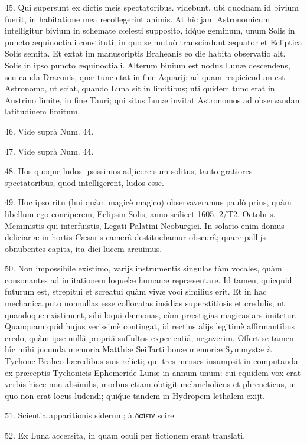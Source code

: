 \documentclass[a4paper, 11pt, oneside, polutonikogreek, german]{article}
\begin{document}
45. Qui supersunt ex dictis meis spectatoribus. videbunt, ubi quodnam id bivium fuerit, in habitatione mea recollegerint animis. At hîc jam Astronomicum intelligitur bivium in schemate cœlesti supposito, id\'que geminum, unum Solis in puncto æquinoctiali constituti; in quo se mutuò transcindunt æquator et Ecliptica Solis semita. Et extat im manuscriptis Braheanis eo die habita observatio alt. Solis in ipso puncto æquinoctiali. Alterum biuium est nodus Lunæ descendens, seu cauda Draconis, quæ tunc etat in fine Aquarij: ad quam respiciendum est Astronomo, ut sciat, quando Luna sit in limitibus; uti quidem tunc erat in Austrino limite, in fine Tauri; qui situs Lunæ invitat Astronomos ad observandam latitudinem limitum.

46. Vide suprà Num. 44.

47. Vide suprà Num. 44.

48. Hos quoque ludos ipsissimos adjicere sum solitus, tanto gratiores spectatoribus, quod intelligerent, ludos esse.

49. Hoc ipso ritu (hui quàm magicè magico) observaveramus paulò prius, quàm libellum ego conciperem, Eclipsin Solis, anno scilicet 1605. 2/T2. Octobris. Meministis qui interfuistis, Legati Palatini Neoburgici. In solario enim domus deliciariæ in hortis Cæsaris camerâ destituebamur obscurâ; quare pallijs obnubentes capita, ita diei lucem arcuimus.

50. Non impossibile existimo, varijs instrumentis singulas tàm vocales, quàm consonantes ad imitationem loquelæ humanæ repræsentare. Id tamen, quicquid futurum est, strepitui et screatui quàm vivæ voci similius erit. Et in hac mechanica puto nonnullas esse collocatas insidias superstitiosis et credulis, ut quandoque existiment, sibi loqui dæmonas, cùm præstigias magicas ars imitetur. Quanquam quid hujus verissimè contingat, id rectius alijs legitimè affirmantibus credo, quàm ipse nullâ propriâ suffultus experientiâ, negaverim.\hspace*{5mm}
Offert se tamen hîc mihi jucunda memoria Matthiæ Seiffarti bonæ memoriæ Symmystæ à Tychone Braheo hæredibus suis relicti; qui tres menses insumpsit in computanda ex præceptis Tychonicis Ephemeride Lunæ in annum unum: cui equidem vox erat verbis hisce non absimilis, morbus etiam obtigit melancholicus et phreneticus, in quo non erat locus ludendi; qui\'que tandem in Hydropem lethalem exijt.

51. Scientia apparitionis siderum; à δαΐειν scire.

52. Ex Luna accersita, in quam oculi per fictionem erant translati.
\end{document}
